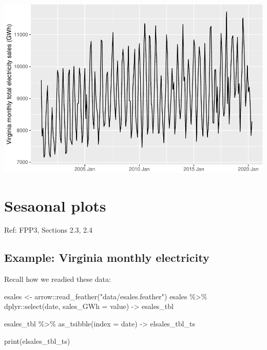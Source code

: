 \documentclass[
]{book}
\newenvironment{Shaded}{\begin{snugshade}}{\end{snugshade}}
\newcommand{\AttributeTok}[1]{\textcolor[rgb]{0.77,0.63,0.00}{#1}}
\newcommand{\FunctionTok}[1]{\textcolor[rgb]{0.00,0.00,0.00}{#1}}
\newcommand{\NormalTok}[1]{#1}
\newcommand{\OtherTok}[1]{\textcolor[rgb]{0.56,0.35,0.01}{#1}}
\newcommand{\SpecialCharTok}[1]{\textcolor[rgb]{0.00,0.00,0.00}{#1}}
\newcommand{\StringTok}[1]{\textcolor[rgb]{0.31,0.60,0.02}{#1}}
\begin{document}
\includegraphics{graphics/use feasts autoplot-1.pdf}

\hypertarget{sesaonal-plots}{%
\section{Sesaonal plots}\label{sesaonal-plots}}

Ref: FPP3, Sections 2.3, 2.4

\hypertarget{example-virginia-monthly-electricity}{%
\subsection{Example: Virginia monthly electricity}\label{example-virginia-monthly-electricity}}

Recall how we readied these data:

\begin{Shaded}
\begin{Highlighting}[]
\NormalTok{esales }\OtherTok{\textless{}{-}}\NormalTok{ arrow}\SpecialCharTok{::}\FunctionTok{read\_feather}\NormalTok{(}\StringTok{"data/esales.feather"}\NormalTok{)}
\NormalTok{esales }\SpecialCharTok{\%\textgreater{}\%}
\NormalTok{  dplyr}\SpecialCharTok{::}\FunctionTok{select}\NormalTok{(date, }\AttributeTok{sales\_GWh =}\NormalTok{ value) }\OtherTok{{-}\textgreater{}}\NormalTok{ esales\_tbl}

\NormalTok{esales\_tbl }\SpecialCharTok{\%\textgreater{}\%} \FunctionTok{as\_tsibble}\NormalTok{(}\AttributeTok{index =}\NormalTok{ date) }\OtherTok{{-}\textgreater{}}\NormalTok{ elsales\_tbl\_ts}

\FunctionTok{print}\NormalTok{(elsales\_tbl\_ts)}
\end{Highlighting}
\end{Shaded}
\end{document}
